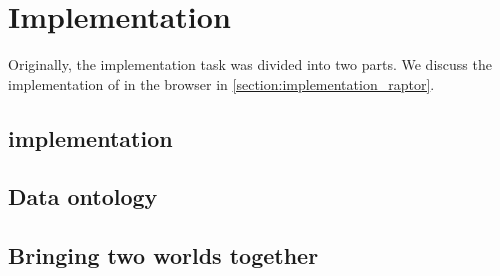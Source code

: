 \chapter{Implementation}
\label{chap:implementation}

Originally, the implementation task was divided into two parts. We discuss the implementation of  in the browser in \autoref{section:implementation_raptor}.


\section{ implementation}\label{section:implementation_raptor}
\section{Data ontology}
\section{Bringing two worlds together}